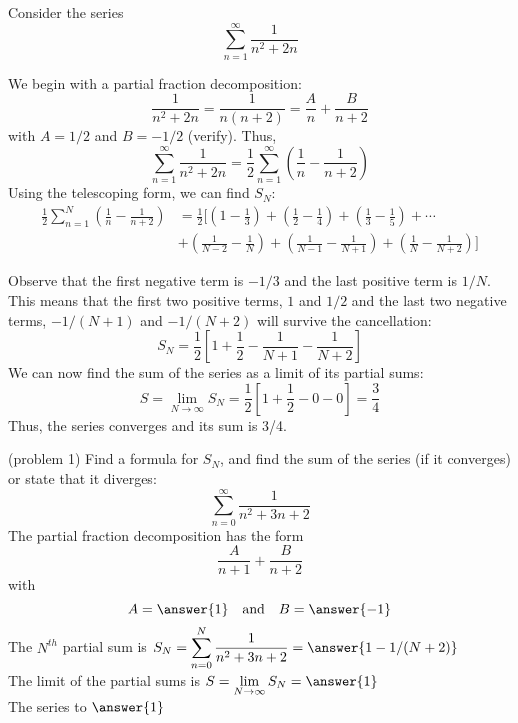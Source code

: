 \documentclass[handout]{ximera}
\begin{document}
\begin{example}[example 2]
Consider the series
\[
\sum_{n=1}^\infty \frac{1}{n^2 +2n}
\]

We begin with a partial fraction decomposition:
\[
\frac{1}{n^2 + 2n} = \frac{1}{n(n+2)} = \frac{A}{n} + \frac{B}{n+2}
\]
with $A = 1/2$ and $B=-1/2$ (verify). Thus,
\[
\sum_{n=1}^\infty \frac{1}{n^2 + 2n}  = \frac12 \sum_{n=1}^\infty \left( \frac{1}{n} - \frac{1}{n+2} \right)
\]
Using the telescoping form, we can find $S_N$:
\begin{align*}
 \frac12 \sum_{n=1}^N  \left(\frac{1}{n}-\frac{1}{n+2}\right) &= \frac12 \Bigg[\left(1 - \frac13 \right) + \left(\frac12 - \frac14 \right) 
 + \left(\frac13 - \frac15 \right) + \cdots \\
 & + \left(\frac{1}{N-2} - \frac{1}{N} \right) +\left(\frac{1}{N-1} - \frac{1}{N+1} \right) +\left(\frac{1}{N} - \frac{1}{N+2} \right) \Bigg]
\end{align*}

Observe that the first negative term is $-1/3$ and the last positive term is $1/N$. This means that the first two positive terms, 
$1$ and $1/2$ and the last two negative terms, $-1/(N+1)$ 
and $-1/(N+2)$  will survive the cancellation:
\[
S_N = \frac12 \left[ 1 + \frac12 - \frac{1}{N+1} - \frac{1}{N+2}\right]
\]
We can now find the sum of the series as a limit of its partial sums:
\[
S  = \lim_{N\to \infty} S_N = \frac12 \left[1 + \frac12 - 0- 0\right] =  \frac34
\]
Thus, the series converges and its sum is 3/4.
\end{example}



\begin{problem}(problem 1)
Find a formula for $S_N$, and find the sum of the series (if it converges) or state that it diverges:
\[
\sum_{n=0}^\infty \frac{1}{n^2 + 3n + 2}
\]
The partial fraction decomposition has the form
\[
\frac{A}{n+1} + \frac{B}{n+2}
\]
with 
\[
A = \answer{1} \quad \mbox{and} \quad B = \answer{-1}
\]
The $N^{th}$ partial sum is  $\displaystyle S_N = \sum_{n=0}^N \frac{1}{n^2 + 3n + 2} = \answer{1 - 1/(N+2)}$\\
The limit of the partial sums is $\displaystyle S = \lim_{N\to \infty}S_N = \answer{1}$\\
The series  to $\answer{1}$

\end{problem}
\end{document}
